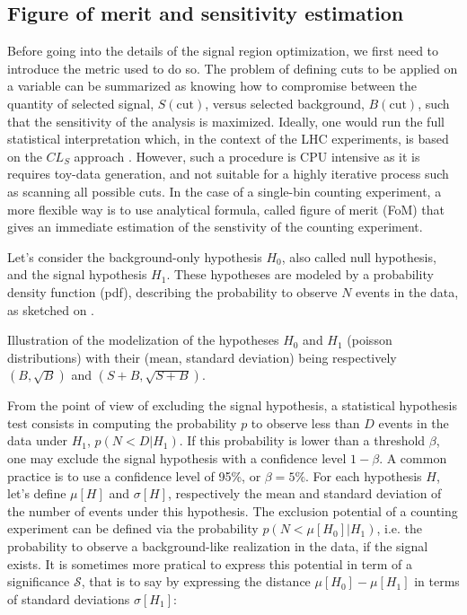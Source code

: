     \subsection{Figure of merit and sensitivity estimation \label{sec:FoMdiscussion}}

    Before going into the details of the signal region optimization, we first need to
    introduce the metric used to do so. The problem of defining cuts to be applied on a
    variable can be summarized as knowing how to compromise between the quantity of
    selected signal, $S(\text{cut})$, versus selected background, $B(\text{cut})$, such
    that the sensitivity of the analysis is maximized. Ideally, one would run the full
    statistical interpretation which, in the context of the LHC experiments, is based
    on the $CL_S$ approach \cite{CLs}. However, such a procedure is CPU intensive as it is
    requires toy-data generation, and not suitable for a highly iterative process such
    as scanning all possible cuts. In the case of a single-bin counting experiment, a more
    flexible way is to use analytical formula, called figure of merit (FoM) that gives an
    immediate estimation of the senstivity of the counting experiment.

    Let's consider the background-only hypothesis $H_0$, also called null hypothesis,
    and the signal hypothesis $H_1$. These hypotheses are modeled by a probability density
    function (pdf), describing the probability to observe $N$ events in the data, as
    sketched on .

                 {Illustration of the modelization of the hypotheses $H_0$ and $H_1$
                 (poisson distributions) with their (mean, standard deviation) being respectively
                 $(B,\sqrt{B})$ and $(S+B,\sqrt{S+B})$.}

    From the point of view of excluding the signal hypothesis, a statistical hypothesis
    test consists in computing the probability $p$ to observe less than $D$ events in the
    data under $H_1$, $p(N < D|H_1)$. If this probability is lower than a threshold
    $\beta$, one may exclude the signal hypothesis with a confidence level $1-\beta$. A
    common practice is to use a confidence level of 95\%, or $\beta = 5\%$. For each
    hypothesis $H$, let's define $\mu[H]$ and $\sigma[H]$, respectively the mean and
    standard deviation of the number of events under this hypothesis.
    The exclusion potential of a counting experiment can be defined via the probability $p(N < \mu[H_0]|H_1)$,
    i.e. the probability to observe a background-like realization in the data, if the
    signal exists. It is sometimes more pratical to express this potential in term of a
    significance $\mathcal{S}$, that is to say by expressing the distance $\mu[H_0] -
    \mu[H_1]$ in terms of standard deviations $\sigma[H_1]$:


